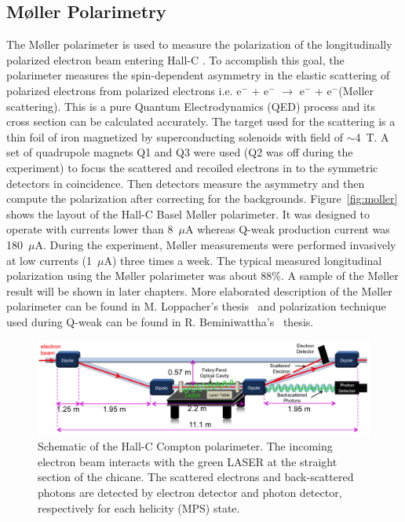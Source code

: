 \subsection{M{\o}ller Polarimetry}%
\label{Moller Polarimetry}
The M{\o}ller polarimeter is used to measure the polarization of the longitudinally polarized electron beam entering Hall-C \cite{Hauger2001382}. To accomplish this goal, the polarimeter measures the spin-dependent asymmetry in the elastic scattering of polarized electrons from polarized electrons i.e. e$^{-}$ + e$^{-}$ $\rightarrow$ e$^{-}$ + e$^{-}$(M{\o}ller scattering). This is a pure Quantum Electrodynamics (QED) process and its cross section can be calculated accurately. The target used for the scattering is a thin foil of iron magnetized by superconducting solenoids with field of $\sim$4~T. A set of quadrupole magnets Q1 and Q3 were used (Q2 was off during the experiment) 
to focus the scattered and recoiled electrons in to the symmetric detectors in coincidence. Then detectors measure the asymmetry and then compute the polarization after correcting for the backgrounds. Figure~\ref{fig:moller} shows the layout of the Hall-C Basel M{\o}ller polarimeter. It was designed to operate with currents lower than 8~$\mu$A whereas Q-weak production current was 180~$\mu$A. During the experiment, M{\o}ller measurements were performed invasively at low currents (1~$\mu$A) three times a week. The typical measured longitudinal polarization using the M{\o}ller polarimeter was about 88\%. A sample of the M{\o}ller result will be shown in later chapters. More elaborated description of the M{\o}ller polarimeter can be found in M. Loppacher's thesis~\cite{Loppacher_moeller_thesis} and polarization technique used during Q-weak can be found in R. Beminiwattha's~\cite{rakitha_qweak} thesis.

\begin{singlespace}
\begin{figure}[!h]
	\begin{center}
	\includegraphics[width=15cm]{figures/compton}
	\caption
	{Schematic of the Hall-C Compton polarimeter. The incoming electron beam interacts with the green LASER at the straight section of the chicane. The scattered electrons and back-scattered photons are detected by electron detector and photon detector, respectively for each helicity (MPS) state.}
	\label{fig:compton}
	\end{center}
\end{figure}
\end{singlespace}

